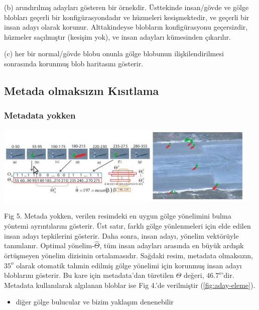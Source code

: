 \documentclass{beamer}
\begin{document}
\begin{frame}[allowframebreaks]
\begin{scriptsize}
	(b) arındırılmış adayları gösteren bir örnekdir. Üsttekinde insan/gövde ve
	gölge blobları geçerli bir konfigürasyondadır ve hüzmeleri kesişmektedir, ve
	geçerli bir insan adayı olarak korunur. Alttakindeyse blobların
	konfigürasyonu geçersizdir, hüzmeler saçılmıştır (kesişim yok), ve insan
	adayları kümesinden çıkarılır.

	(c) her bir normal/gövde blobu onunla gölge blobunun ilişkilendirilmesi
	sonrasında korunmuş blob haritasını gösterir.

	\end{scriptsize}
\end{frame}

\subsection{Metada olmaksızın Kısıtlama}

\begin{frame}
	\frametitle{Metadata yokken}

	\includegraphics[width=0.95\textwidth]{img/fig5.jpg}\label{fig:optimal-shadow-orientation}

	\begin{scriptsize}
		Fig 5. Metada yokken, verilen resimdeki en uygun gölge yönelimini bulma
		yöntemi ayrıntılarını gösterir. Üst satır, farklı gölge yönlenmeleri için
		elde edilen insan adayı tepkilerini gösterir. Daha sonra, insan adayı,
		yönelim vektörüyle tanımlanır. Optimal yönelim-$\hat{\Theta}$, tüm insan
		adayları arasında en büyük ardışık örtüşmeyen yönelim dizisinin
		ortalamasıdır. Sağdaki resim, metadata olmaksızın, $35^o$ olarak otomatik
		tahmin edilmiş gölge yönelimi için korunmuş insan adayı bloblarını gösterir.
		Bu kare için metadata'dan türetilen $\Theta$ değeri, $46.7^o$'dir. Metadata
		kullanılarak algılanan bloblar ise Fig 4.'de verilmiştir
		(\ref{fig:aday-eleme}).
	\end{scriptsize}

	\begin{itemize}
		\item diğer gölge bulucular ve bizim yaklaşım denenebilir
	\end{itemize}
\end{frame}
\end{document}

